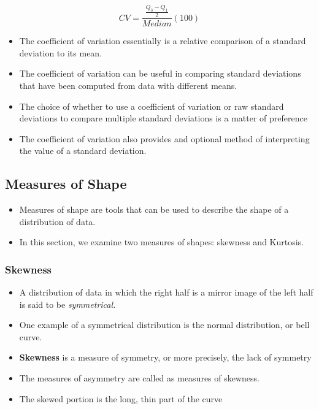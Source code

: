 \documentclass[]{book}
\begin{document}
\[CV = \frac{\frac{Q_3 - Q_1}{2}}{Median}(100)\]

\begin{itemize}
\item
  The coefficient of variation essentially is a relative comparison of a standard deviation to its mean.
\item
  The coefficient of variation can be useful in comparing standard deviations that have been computed from data with different means.
\item
  The choice of whether to use a coefficient of variation or raw standard deviations to compare multiple standard deviations is a matter of preference
\item
  The coefficient of variation also provides and optional method of interpreting the value of a standard deviation.
\end{itemize}

\hypertarget{measures-of-shape}{%
\subsection{Measures of Shape}\label{measures-of-shape}}

\begin{itemize}
\item
  Measures of shape are tools that can be used to describe the shape of a distribution of data.
\item
  In this section, we examine two measures of shapes: skewness and Kurtosis.
\end{itemize}

\hypertarget{skewness}{%
\subsubsection{Skewness}\label{skewness}}

\begin{itemize}
\item
  A distribution of data in which the right half is a mirror image of the left half is said to be \emph{symmetrical.}
\item
  One example of a symmetrical distribution is the normal distribution, or bell curve.
\item
  \textbf{Skewness} is a measure of symmetry, or more precisely, the lack of symmetry
\item
  The measures of asymmetry are called as measures of skewness.
\item
  The skewed portion is the long, thin part of the curve
\end{itemize}
\end{document}
